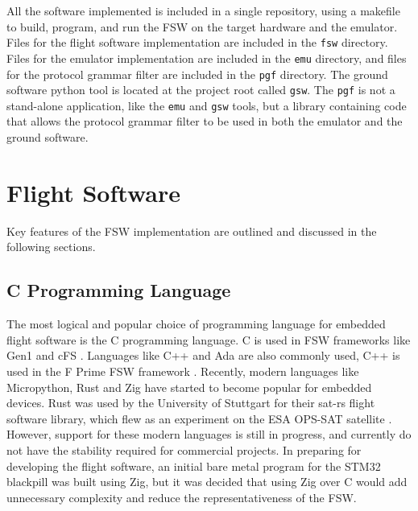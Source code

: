 \documentclass[../report.tex]{subfiles}
\begin{document}



All the software implemented is included in a single repository, using a
makefile to build, program, and run the FSW on the target hardware and the
emulator. Files for the flight software implementation are included in the
\lstinline|fsw| directory. Files for the emulator implementation are included
in the \lstinline|emu| directory, and files for the protocol grammar filter
are included in the \lstinline|pgf| directory. The ground software python tool
is located at the project root called \lstinline|gsw|. The \lstinline|pgf| is
not a stand-alone application, like the \lstinline|emu| and \lstinline|gsw|
tools, but a library containing code that allows the protocol grammar filter to
be used in both the emulator and the ground software.

\section{Flight Software}

Key features of the FSW implementation are outlined and discussed in the
following sections.

\subsection{C Programming Language} %

The most logical and popular choice of programming language for embedded flight
software is the C programming language. C is used in FSW frameworks like Gen1
and cFS \citep{Bal_FSDK, Nasa_cFS}. Languages like C++ and Ada are also
commonly used, C++ is used in the F Prime FSW framework \citep{Nasa_fprime}.
Recently, modern languages like Micropython, Rust and Zig have started to
become popular for embedded devices. Rust was used by the University of
Stuttgart for their sat-rs flight software library, which flew as an experiment
on the ESA OPS-SAT satellite \citep{satrs, opsat}. However, support for these
modern languages is still in progress, and currently do not have the stability
required for commercial projects. In preparing for developing the flight
software, an initial bare metal program for the STM32 blackpill was built using
Zig, but it was decided that using Zig over C would add unnecessary complexity
and reduce the representativeness of the FSW.
\end{document}

